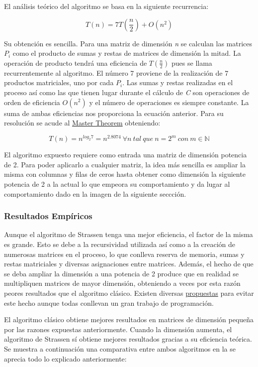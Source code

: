 \documentclass[]{article}
\begin{document}
El análisis teórico del algoritmo se basa en la siguiente recurrencia:

\[ T(n) = 7T(\frac{n}{2}) + O(n^2) \]

Su obtención es sencilla. Para una matriz de dimensión \emph{n} se
calculan las matrices \(P_i\) como el producto de sumas y restas de
matrices de dimensión la mitad. La operación de producto tendrá una
eficiencia de \(T(\frac{n}{2})\) pues se llama recurrentemente al
algoritmo. El número 7 proviene de la realización de 7 productos
matriciales, uno por cada \(P_i\). Las sumas y restas realizadas en el
proceso así como las que tienen lugar durante el cálculo de \emph{C} son
operaciones de orden de eficiencia \(O(n^2)\) y el número de operaciones
es siempre constante. La suma de ambas eficiencias nos proporciona la
ecuación anterior. Para su resolución se acude al
\href{http://en.wikipedia.org/wiki/Master_theorem}{Master Theorem}
obteniendo:

\[ T(n) = n^{log_2 7} = n^{2.8074} \ \forall n \ tal \ que \ n = 2^m \ con \ m \in \mathbb{N} \]

El algoritmo expuesto requiere como entrada una matriz de dimensión
potencia de 2. Para poder aplicarlo a cualquier matriz, la idea más
sencilla es ampliar la misma con columnas y filas de ceros hasta obtener
como dimensión la siguiente potencia de 2 a la actual lo que empeora su
comportamiento y da lugar al comportamiento dado en la imagen de la
siguiente seccción.

\subsubsection{Resultados Empíricos}\label{resultados-empiricos-3}

Aunque el algoritmo de Strassen tenga una mejor eficiencia, el factor de
la misma es grande. Esto se debe a la recursividad utilizada así como a
la creación de numerosas matrices en el proceso, lo que conlleva reserva
de memoria, sumas y restas matriciales y diversas asignaciones entre
matrices. Además, el hecho de que se deba ampliar la dimensión a una
potencia de 2 produce que en realidad se multipliquen matrices de mayor
dimensión, obteniendo a veces por esta razón peores resultados que el
algoritmo clásico. Existen diversas
\href{www.cs.duke.edu/~alvy/papers/sc98/}{propuestas} para evitar este
hecho aunque todas conllevan un gran trabajo de programación.

El algoritmo clásico obtiene mejores resultados en matrices de dimensión
pequeña por las razones expuestas anteriormente. Cuando la dimensión
aumenta, el algoritmo de Strassen sí obtiene mejores resultados gracias
a su eficiencia teórica. Se muestra a continuación una comparativa entre
ambos algoritmos en la se aprecia todo lo explicado anteriormente:
\end{document}
